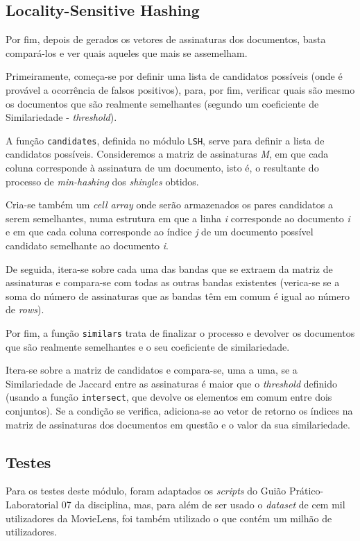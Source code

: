 \documentclass[a4paper,11pt,openright,oneside]{report}
\begin{document}
\subsection{Locality-Sensitive Hashing}
\label{subsec.lsh}

Por fim, depois de gerados os vetores de assinaturas dos documentos, basta compará-los e ver quais aqueles que mais se assemelham.

Primeiramente, começa-se por definir uma lista de candidatos possíveis (onde é provável a ocorrência de falsos positivos), para, por fim, verificar quais são mesmo os documentos que são realmente semelhantes (segundo um coeficiente de Similariedade - \textit{threshold}).

A função \texttt{candidates}, definida no módulo \texttt{LSH}, serve para definir a lista de candidatos possíveis. Consideremos a matriz de assinaturas \textit{M}, em que cada coluna corresponde à assinatura de um documento, isto é, o resultante do processo de \textit{min-hashing} dos \textit{shingles} obtidos.


Cria-se também um \textit{cell array} onde serão armazenados os pares candidatos a serem semelhantes, numa estrutura em que a linha \textit{i} corresponde ao documento \textit{i} e em que cada coluna corresponde ao índice \textit{j} de um documento possível candidato semelhante ao documento \textit{i}.

De seguida, itera-se sobre cada uma das bandas que se extraem da matriz de assinaturas e compara-se com todas as outras bandas existentes (verica-se se a soma do número de assinaturas que as bandas têm em comum é igual ao número de \textit{rows}).

Por fim, a função \texttt{similars} trata de finalizar o processo e devolver os documentos que são realmente semelhantes e o seu coeficiente de similariedade.

Itera-se sobre a matriz de candidatos e compara-se, uma a uma, se a Similariedade de Jaccard entre as assinaturas é maior que o \textit{threshold} definido (usando a função \texttt{intersect}, que devolve os elementos em comum entre dois conjuntos). Se a condição se verifica, adiciona-se ao vetor de retorno os índices na matriz de assinaturas dos documentos em questão e o valor da sua similariedade.

\subsection{Testes}
\label{subsec.lshtests}
Para os testes deste módulo, foram adaptados os \textit{scripts} do Guião Prático-Laboratorial 07 da disciplina, mas, para além de ser usado o \textit{dataset} de cem mil utilizadores da MovieLens, foi também utilizado o que contém um milhão de utilizadores.
\end{document}
